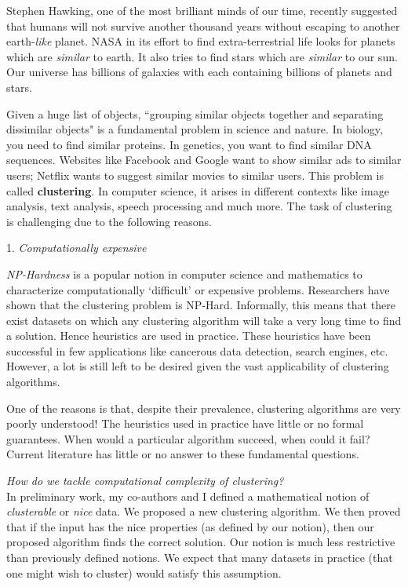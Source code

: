 \documentclass[12pt]{article}
\begin{document}
\linespread{0.901}
\hspace{0.5cm} Stephen Hawking, one of the most brilliant minds of our time, recently suggested that humans will not survive another thousand years without escaping to another earth-\textit{like} planet. 
NASA in its effort to find extra-terrestrial life looks for planets which are \emph{similar} to earth. It also tries to find stars which are \emph{similar} to our sun. Our universe has billions of galaxies with each containing billions of planets and stars. 

\hspace{0.5cm} Given a huge list of objects, ``grouping similar objects together and separating dissimilar objects" is a fundamental problem in science and nature. In biology, you need to find similar proteins. In genetics, you want to find similar DNA sequences. Websites like Facebook and Google want to show similar ads to similar users; Netflix wants to suggest similar movies to similar users. This problem is called \textbf{clustering}. In computer science, it arises in different contexts like image analysis, text analysis, speech processing and much more. The task of clustering is challenging due to the following reasons. 

\vspace{0.05in} 1. \emph{Computationally expensive}

\emph{NP-Hardness} is a popular notion in computer science and mathematics to characterize computationally `difficult' or expensive problems. Researchers have shown that the clustering problem is NP-Hard. Informally, this means that there exist datasets on which any clustering algorithm will take a very long time to find a solution. Hence heuristics are used in practice. These heuristics have been successful in few applications like cancerous data detection, search engines, etc. However, a lot is still left to be desired given the vast applicability of clustering algorithms. 

One of the reasons is that, despite their prevalence, clustering algorithms are very poorly understood! The heuristics used in practice have little or no formal guarantees. When would a particular algorithm succeed, when could it fail? Current literature has little or no answer to these fundamental questions. 

\emph{How do we tackle computational complexity of clustering?}\\ 
In preliminary work, my co-authors and I defined a mathematical notion of {\em clusterable} or {\em nice} data. We proposed a new clustering algorithm. We then proved that if the input has the nice properties (as defined by our notion), then our proposed algorithm finds the correct solution. Our notion is much less restrictive than previously defined notions. We expect that many datasets in practice (that one might wish to cluster) would satisfy this assumption.
\end{document}
